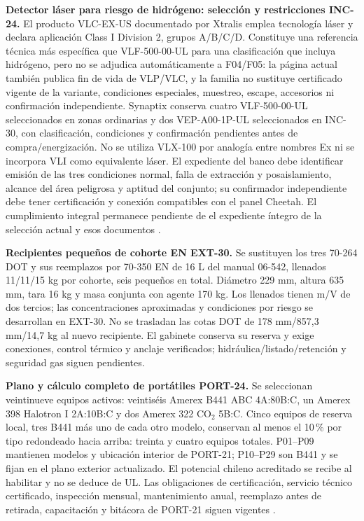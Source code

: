 \textbf{Detector láser para riesgo de hidrógeno: selección y restricciones INC-24.}\label{sec:sd4-inc24}
El producto VLC-EX-US documentado por Xtralis emplea tecnología láser y declara aplicación Class I Division 2, grupos A/B/C/D. Constituye una referencia técnica más específica que VLF-500-00-UL para una clasificación que incluya hidrógeno, pero no se adjudica automáticamente a F04/F05: la página actual también publica fin de vida de VLP/VLC, y la familia no sustituye certificado vigente de la variante, condiciones especiales, muestreo, escape, accesorios ni confirmación independiente. Synaptix conserva cuatro VLF-500-00-UL seleccionados en zonas ordinarias y dos VEP-A00-1P-UL seleccionados en INC-30, con clasificación, condiciones y confirmación pendientes antes de compra/energización. No se utiliza VLX-100 por analogía entre nombres Ex ni se incorpora VLI como equivalente láser. El expediente del banco debe identificar emisión de las tres condiciones normal, falla de extracción y posaislamiento, alcance del área peligrosa y aptitud del conjunto; su confirmador independiente debe tener certificación y conexión compatibles con el panel Cheetah. El cumplimiento integral permanece pendiente de el expediente íntegro de la selección actual y esos documentos \parencite{l24-xtralis-vlc}.

\textbf{Recipientes pequeños de cohorte EN EXT-30.}\label{sec:sd4-ext24}
Se sustituyen los tres 70-264 DOT y sus reemplazos por 70-350 EN de 16 L del manual 06-542, llenados 11/11/15 kg por cohorte, seis pequeños en total. Diámetro 229 mm, altura 635 mm, tara 16 kg y masa conjunta con agente 170 kg. Los llenados tienen m/V de dos tercios; las concentraciones aproximadas y condiciones por riesgo se desarrollan en EXT-30. No se trasladan las cotas DOT de 178 mm/857,3 mm/14,7 kg al nuevo recipiente. El gabinete conserva su reserva y exige conexiones, control térmico y anclaje verificados; hidráulica/listado/retención y seguridad gas siguen pendientes.

\textbf{Plano y cálculo completo de portátiles PORT-24.}\label{sec:sd4-port24}
Se seleccionan veintinueve equipos activos: veintiséis Amerex B441 ABC 4A:80B:C, un Amerex 398 Halotron I 2A:10B:C y dos Amerex 322 CO$_2$ 5B:C. Cinco equipos de reserva local, tres B441 más uno de cada otro modelo, conservan al menos el 10\,\% por tipo redondeado hacia arriba: treinta y cuatro equipos totales. P01--P09 mantienen modelos y ubicación interior de PORT-21; P10--P29 son B441 y se fijan en el plano exterior actualizado. El potencial chileno acreditado se recibe al habilitar y no se deduce de UL. Las obligaciones de certificación, servicio técnico certificado, inspección mensual, mantenimiento anual, reemplazo antes de retirada, capacitación y bitácora de PORT-21 siguen vigentes \parencites[pp.~9, 11--12]{l21-amerex}[arts.~45--51]{l21-ds594}[arts.~23--33]{l21-ds44}.

